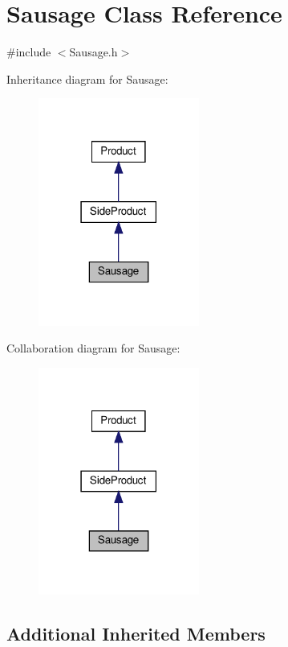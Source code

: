 \hypertarget{classSausage}{}\section{Sausage Class Reference}
\label{classSausage}


{\ttfamily \#include $<$Sausage.\+h$>$}



Inheritance diagram for Sausage\+:
\nopagebreak
\begin{figure}[H]
\begin{center}
\leavevmode
\includegraphics[width=150pt]{classSausage__inherit__graph}
\end{center}
\end{figure}


Collaboration diagram for Sausage\+:
\nopagebreak
\begin{figure}[H]
\begin{center}
\leavevmode
\includegraphics[width=150pt]{classSausage__coll__graph}
\end{center}
\end{figure}
\subsection*{Additional Inherited Members}


